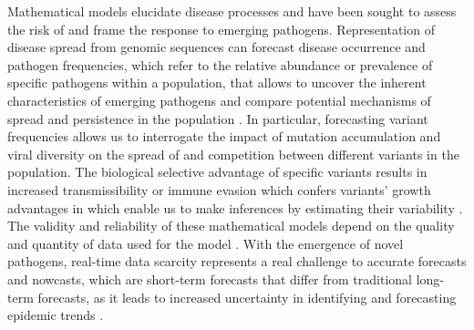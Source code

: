 \documentclass[11pt,oneside,letterpaper]{article}
\begin{document}
Mathematical models elucidate disease processes and have been sought to assess the risk of and frame the response to emerging pathogens.
Representation of disease spread from genomic sequences can forecast disease occurrence and pathogen frequencies, which refer to the relative abundance or prevalence of specific pathogens within a population, that allows to uncover the inherent characteristics of emerging pathogens and compare potential mechanisms of spread and persistence in the population \cite{metcalf_opportunities_2017}.
In particular, forecasting variant frequencies allows us to interrogate the impact of mutation accumulation and viral diversity on the spread of and competition between different variants in the population.
The biological selective advantage of specific variants results in increased transmissibility or immune evasion which confers variants' growth advantages in which enable us to make inferences by estimating their variability \cite{tegally_detection_2021}.
The validity and reliability of these mathematical models depend on the quality and quantity of data used for the model \cite{tao_biological_2021}.
With the emergence of novel pathogens, real-time data scarcity represents a real challenge to accurate forecasts and nowcasts, which are short-term forecasts that differ from traditional long-term forecasts, as it leads to increased uncertainty in identifying and forecasting epidemic trends \cite{metcalf_opportunities_2017}. 


\end{document}

